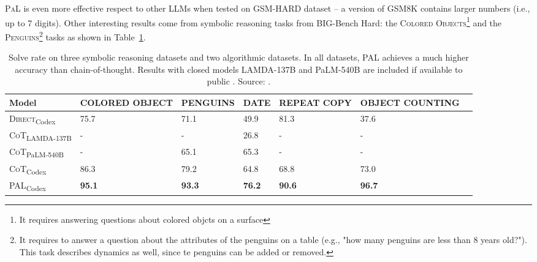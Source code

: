 \textsc{PaL} is even more effective respect to other LLMs when tested on GSM-HARD dataset -- a version of GSM8K contains larger numbers (i.e., up to 7 digits).
Other interesting results come from symbolic reasoning tasks from BIG-Bench Hard: the \textsc{Colored Objects}\footnote{It requires answering questions about colored objcts on a surface} and the \textsc{Penguins}\footnote{It requires to answer a question about the attributes of the penguins on a table (e.g., "how many penguins are less than 8 years old?"). This task describes dynamics as well, since te penguins can be added or removed.} tasks as shown in Table~\ref{tab:pal-symbolic}.
\begin{table}[h!]
	\centering
	\small
	\begin{tabularx}{\textwidth}{XXXXXXX}
		\hline
		\textbf{Model}                         & \textbf{COLORED                                                                 \newline OBJECT} & \textbf{PENGUINS} & \textbf{DATE} & \textbf{REPEAT \newline COPY} & \textbf{OBJECT COUNTING} \\ \hline
		\textsc{Direct}\textsubscript{Codex}   & 75.7                                                                                             & 71.1              & 49.9          & 81.3                          & 37.6                     \\
		\textsc{CoT}\textsubscript{LAMDA-137B} & -                                                                                                & -                 & 26.8          & -                             & -                        \\
		\textsc{CoT}\textsubscript{PaLM-540B}  & -                                                                                                & 65.1              & 65.3          & -                             & -                        \\
		\textsc{CoT}\textsubscript{Codex}      & 86.3                                                                                             & 79.2              & 64.8          & 68.8                          & 73.0                     \\
		\textsc{PAL}\textsubscript{Codex}      & \textbf{95.1}                                                                                    & \textbf{93.3}     & \textbf{76.2} & \textbf{90.6}                 & \textbf{96.7}            \\ \hline
	\end{tabularx}
	\caption{Solve rate on three symbolic reasoning datasets and two algorithmic datasets. In all datasets, PAL achieves a much higher accuracy than chain-of-thought. Results with closed models LAMDA-137B and PaLM-540B are included if available to public \textcite{wei2022chain, suzgun2022challenging}. Source: \textcite{gao2022pal}.}
	\label{tab:pal-symbolic}
\end{table}
